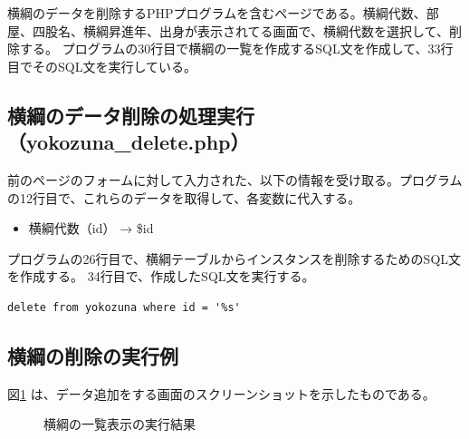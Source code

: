 \documentclass[10pt,a4paper,titlepage]{jreport}
\begin{document}
横綱のデータを削除するPHPプログラムを含むページである。横綱代数、部屋、四股名、横綱昇進年、出身が表示されてる画面で、横綱代数を選択して、削除する。
プログラムの30行目で横綱の一覧を作成するSQL文を作成して、33行目でそのSQL文を実行している。\\




\subsection{横綱のデータ削除の処理実行（yokozuna\_delete.php）}

前のページのフォームに対して入力された、以下の情報を受け取る。プログラムの12行目で、これらのデータを取得して、各変数に代入する。



\begin{itemize}
\item 横綱代数（id） → \$id
\end{itemize}

プログラムの26行目で、横綱テーブルからインスタンスを削除するためのSQL文を作成する。
34行目で、作成したSQL文を実行する。\\

\begin{lstlisting}[caption=横綱の削除のためのSQL]
delete from yokozuna where id = '%s' 
\end{lstlisting}
\vspace{3mm}

\subsection{横綱の削除の実行例}

図\ref{fig:example_list3} は、データ追加をする画面のスクリーンショットを示したものである。

\begin{figure}[h]
	\begin{center}
	\end{center}
	\caption{横綱の一覧表示の実行結果
	}
	\label{fig:example_list3}
\end{figure}
\end{document}
